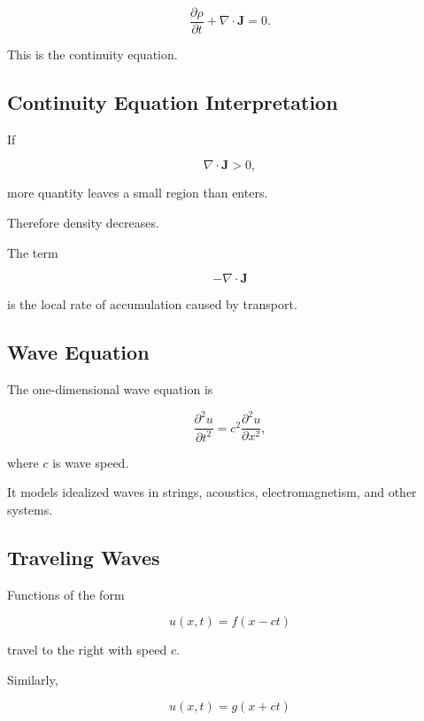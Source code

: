 \[
\boxed{
\frac{\partial\rho}{\partial t}
+
\nabla\cdot\mathbf{J}
=
0.
}
\]

This is the continuity equation.

\subsection{Continuity Equation Interpretation}
\label{subsec:continuity-equation-interpretation}

If

\[
\nabla\cdot\mathbf{J}>0,
\]

more quantity leaves a small region than enters.

Therefore density decreases.

The term

\[
-\nabla\cdot\mathbf{J}
\]

is the local rate of accumulation caused by transport.

\subsection{Wave Equation}
\label{subsec:physical-wave-equation}

The one-dimensional wave equation is

\[
\boxed{
\frac{\partial^2u}{\partial t^2}
=
c^2
\frac{\partial^2u}{\partial x^2},
}
\]

where \(c\) is wave speed.

It models idealized waves in strings, acoustics, electromagnetism, and other
systems.

\subsection{Traveling Waves}
\label{subsec:traveling-waves}

Functions of the form

\[
\boxed{
u(x,t)
=
f(x-ct)
}
\]

travel to the right with speed \(c\).

Similarly,

\[
\boxed{
u(x,t)
=
g(x+ct)
}
\]

